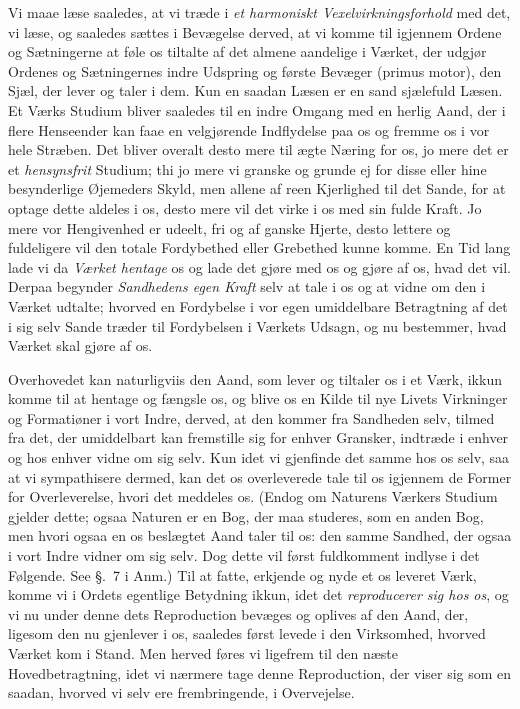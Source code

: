 \documentclass[12pt,a4paper]{book}
\newcommand{\apage}[1]{\marginnote{\footnotesize\textit{[#1]}}}
\begin{document}
Vi maae læse saaledes, at vi træde i \emph{et harmoniskt Vexelvirkningsforhold}
med det, vi læse, og saaledes sættes i Bevægelse derved, at vi komme til
igjennem Ordene og Sætningerne at føle os tiltalte af det almene aandelige i
Værket, der udgjør Ordenes og Sætningernes indre Udspring og første Bevæger
(primus motor), den Sjæl, der lever og taler i dem. Kun en saadan Læsen er en
sand sjælefuld Læsen. Et Værks Studium bliver saaledes til en indre Omgang med
en herlig Aand, der i flere Henseender kan faae en velgjørende Indflydelse paa
os og fremme os i vor hele Stræben. Det bliver overalt desto mere til ægte
Næring for os, jo mere det er et \emph{hensynsfrit} Studium; thi jo mere vi
granske og grunde ej for disse eller hine besynderlige Øjemeders Skyld, men
allene af reen Kjerlighed til det Sande, for at optage dette aldeles i os, desto
mere vil det virke i os med sin fulde Kraft. Jo mere vor Hengivenhed er udeelt,
fri og af ganske Hjerte, desto lettere og fuldeligere vil den totale
Fordybethed eller Grebethed kunne komme. En Tid lang lade vi da \emph{Værket hentage}
os og lade det gjøre med os og gjøre af os, hvad det vil. Derpaa begynder
\emph{Sandhedens egen Kraft} selv at tale i os \apage{17} og at vidne om den i Værket udtalte;
hvorved en Fordybelse i vor egen umiddelbare Betragtning af det i sig selv Sande
træder til Fordybelsen i Værkets Udsagn, og nu bestemmer, hvad Værket skal gjøre
af os.

Overhovedet kan naturligviis den Aand, som lever og tiltaler os i et Værk, ikkun
komme til at hentage og fængsle os, og blive os en Kilde til nye Livets
Virkninger og Formatiøner i vort Indre, derved, at den kommer fra Sandheden
selv, tilmed fra det, der umiddelbart kan fremstille sig for enhver Gransker,
indtræde i enhver og hos enhver vidne om sig selv. Kun idet vi gjenfinde det
samme hos os selv, saa at vi sympathisere dermed, kan det os overleverede tale
til os igjennem de Former for Overleverelse, hvori det meddeles os. (Endog om
Naturens Værkers Studium gjelder dette; ogsaa Naturen er en Bog, der maa
studeres, som en anden Bog, men hvori ogsaa en os beslægtet Aand taler til os:
den samme Sandhed, der ogsaa i vort Indre vidner om sig selv. Dog dette vil
først fuldkomment indlyse i det Følgende. See §.~7 i Anm.) Til at fatte,
erkjende og nyde et os leveret Værk, komme vi i Ordets egentlige Betydning
ikkun, idet det \emph{reproducerer sig hos os}, og vi nu under denne dets
Reproduction bevæges og oplives af den Aand, der, ligesom den nu gjenlever i os,
\apage{18} saaledes først levede i den Virksomhed, hvorved Værket kom i Stand. Men herved
føres vi ligefrem til den næste Hovedbetragtning, idet vi nærmere tage denne
Reproduction, der viser sig som en saadan, hvorved vi selv ere frembringende, i
Overvejelse.
\end{document}
